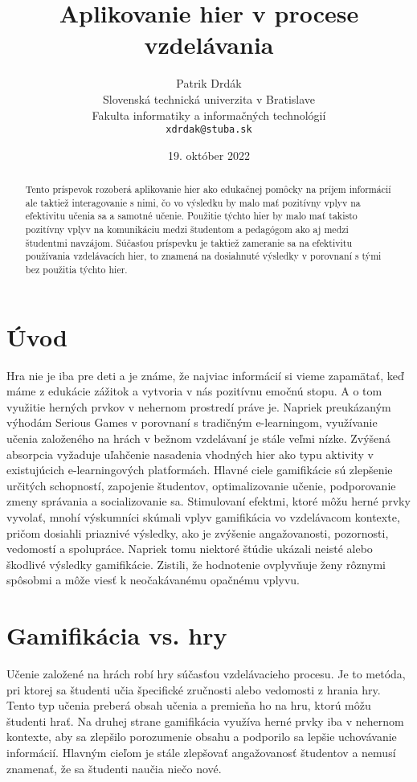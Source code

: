 \documentclass[10pt,twoside,slovak,a4paper]{article}
\title{Aplikovanie hier v procese vzdelávania
} %
\author{Patrik Drdák\\[2pt]
	{\small Slovenská technická univerzita v Bratislave}\\
	{\small Fakulta informatiky a informačných technológií}\\
	{\small \texttt{xdrdak@stuba.sk}}
	}
\date{\small 19. október 2022} %
\begin{document}
\maketitle

\begin{abstract}
Tento príspevok rozoberá aplikovanie hier
ako edukačnej pomôcky na príjem informácií ale taktiež interagovanie s nimi,
čo vo výsledku by malo mať pozitívny vplyv na efektivitu učenia sa a samotné
učenie. Použitie týchto hier by malo mať takisto pozitívny vplyv na komunikáciu medzi študentom a pedagógom ako aj medzi študentmi navzájom. Súčasťou príspevku je taktiež zameranie sa na efektivitu používania vzdelávacích hier, to znamená na dosiahnuté výsledky v porovnaní s tými bez použitia týchto hier.

\end{abstract}



\section{Úvod}

Hra nie je iba pre deti a je známe, že najviac informácií si vieme zapamätať, keď máme z edukácie zážitok a vytvoria v nás pozitívnu emočnú stopu. A o tom využitie herných prvkov v nehernom prostredí práve je. Napriek preukázaným výhodám Serious Games v porovnaní s tradičným e-learningom, využívanie učenia založeného na hrách
v bežnom vzdelávaní je stále veľmi nízke. Zvýšená absorpcia
vyžaduje uľahčenie nasadenia vhodných hier ako typu aktivity
v existujúcich e-learningových platformách. Hlavné ciele gamifikácie sú zlepšenie určitých schopností, zapojenie študentov, optimalizovanie učenie, podporovanie zmeny správania a socializovanie sa. Stimulovaní efektmi, ktoré môžu herné prvky vyvolať, mnohí výskumníci skúmali vplyv gamifikácia vo vzdelávacom kontexte, pričom dosiahli priaznivé výsledky, ako je zvýšenie angažovanosti, pozornosti, vedomostí a spolupráce. Napriek tomu niektoré štúdie ukázali neisté alebo škodlivé výsledky gamifikácie. Zistili, že hodnotenie ovplyvňuje ženy rôznymi spôsobmi a môže viesť k neočakávanému opačnému vplyvu.





\section{Gamifikácia vs. hry} 
Učenie založené na hrách robí hry súčasťou vzdelávacieho procesu.
Je to metóda, pri ktorej sa študenti učia špecifické zručnosti alebo vedomosti z hrania hry.
Tento typ učenia preberá obsah učenia a premieňa ho na hru, ktorú môžu študenti hrať.
Na druhej strane gamifikácia využíva herné prvky iba v nehernom kontexte, aby sa zlepšilo porozumenie obsahu a podporilo sa lepšie uchovávanie informácií.
Hlavným cieľom je stále zlepšovať angažovanosť študentov a nemusí znamenať, že sa študenti naučia niečo nové.
\end{document}
